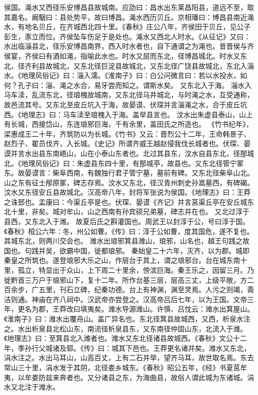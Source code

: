 \documentclass[12pt,UTF8]{ctexbook}
\begin{document}
侯国。渑水又西径乐安博昌县故城南。应劭曰：昌水出东莱昌阳县，道远不至，取其嘉名。阚駰曰：县处势平，故曰博昌。渑水西历贝丘。京相璠曰：博昌县南近渑水，有地名贝丘，在齐城西北四十里。《春秋》庄公八年，齐侯田于贝丘，见公子彭生，豕立而位。齐侯坠车伤足于是处也。渑水又西北人时水。《从征记》又曰：水出临淄县北，径乐安博昌南界，西入时水者也，自下通谓之为渑也。昔晋侯与齐侯宴，齐侯曰有酒如渑，指喻此水也。时水又屈而东北，径博昌城北。时水又东北，径齐利县故城北，又东北径巨淀县故城北，又东北径广饶县故城北，东北入淄水。《地理风俗记》曰：淄入濡。《淮南子》曰：白公问微言曰：若以水投水，如何？孔子曰：淄、渑之水合，易牙尝而知之。谓斯水矣。
又东北入于海。
淄水入马车渎，乱流东北，径琅槐故城南，又东北径马井城北，与时渑之水，互受通称，故邑流其号。又东北至皮丘坑入于海，故晏谟、伏琛并言淄渑之水，合于皮丘坑西。《地理志》曰：马车渎至琅槐入于海。盖举县言也。
汶水出朱虚县泰山，山上有长城，西接岱山，东连琅邪巨海，千有余里，盖田氏之所造也。
《竹书纪年》，梁惠成王二十年，齐筑防以为长城。《竹书》又云：晋烈公十二年，王命韩景子、赵烈子、翟员伐齐，入长城。《史记》所谓齐威王越赵侵我伐长城者也。伏琛、晏谟并言水出县东南峿山，山在小泰山东者也。北过其县东，汶水自县东北，径郚城北。《地理风俗记》曰：朱虚县东四十里，有郚城亭，故县也。又东北径管宁冢东。故晏谟言：柴阜西南，有魏独行君子管宁墓，墓前有碑。又东北径柴阜山北。山之东有征士邴原冢，碑志存焉。汶水又东北，径汉青州刺史孙嵩墓西，有碑碣。汶水又东径安丘县故城北。汉高帝八年，封将军张说为侯国。《地理志》曰：王莽之诛郅也。孟康曰：今渠丘亭是也。伏琛、晏谟《齐记》并言莒渠丘亭在安丘城东北十里，非矣。城对牟山，山之西南有孙宾硕兄弟墓，碑志并在也。
又北过淳于县西，又东北入于潍。
故夏后氏之斟灌国也。周武王以封淳于公，号曰淳于国。《春秋》桓公六年：冬，州公如曹。《传》曰：淳于公如曹，度其国危，遂不复也。其城东北，则两川交会也。
潍水出琅邪箕县潍山，琅邪，山名也，越王句践之故国也。句践并吴，欲霸中国，徙都琅邪。
秦始皇二十六年，灭齐，以为郡。城即秦皇之所筑也。遂登琅邪大乐之山，作层台于其上，谓之琅邪台。台在城东南十里，孤立，特显出于众山，上下周二十里余，傍滨巨海。秦王乐之，因留三月。乃徙黔首三万户于琅邪山下，复十二年。所作台基三层，层高三丈，上级平敞，方二百余步，广五里，刊石立碑，纪秦功德。台上有神渊，渊至灵焉。人污之则竭，斋洁则通。神庙在齐八祠中。汉武帝亦尝登之。汉高帝吕后七年，以为王国。文帝三年，更名为郡，王莽改曰填夷矣。潍水导源潍山。许慎、吕忱云：潍水出箕屋山。《淮南子》曰：潍水出覆舟山。盖广异名也。东北径箕县故城西，又西，析泉水注之。水出析泉县北松山东，南流径析泉县东，又东南径仲固山东，北流入于潍。《地理志》曰：至箕县北入潍者也。潍水又东北径诸县故城西。《春秋》文公十二年，季孙行父城诸及郓。《传》曰：城其下邑也。王莽更名诸并矣。潍水又东北，涓水注之。水出马耳山，山高百丈，上有二石并举，望齐马耳，故世取名焉。东去常山三十里，涓水发于其阴，北径娄乡城东。《春秋》昭公五年，《经》书夏莒牟夷，以牟娄防兹来奔者也。又分诸县之东，为海曲县，故俗人谓此城为东诸城。涓水又北注于潍水。
\end{document}
